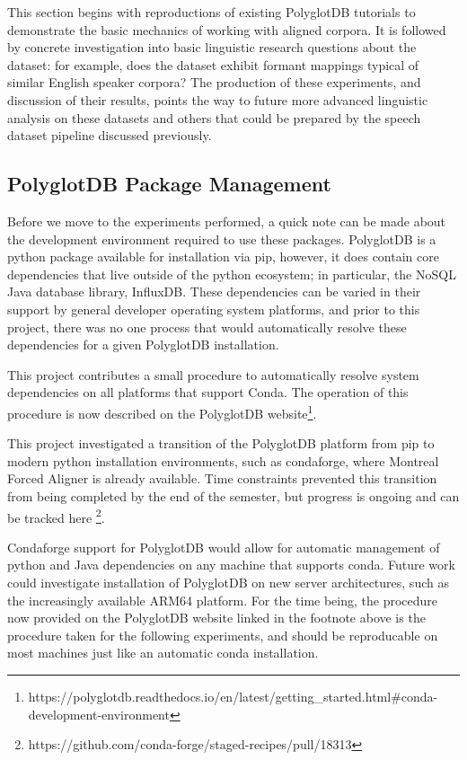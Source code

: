 \documentclass[11pt]{article}
\begin{document}
This section begins with reproductions of existing PolyglotDB tutorials to demonstrate the basic mechanics of working with aligned corpora. It is followed by concrete investigation into basic linguistic research questions about the dataset: for example, does the dataset exhibit formant mappings typical of similar English speaker corpora? The production of these experiments, and discussion of their results, points the way to future more advanced linguistic analysis on these datasets and others that could be prepared by the speech dataset pipeline discussed previously.

\subsection{PolyglotDB Package Management}

Before we move to the experiments performed, a quick note can be made about the development environment required to use these packages. PolyglotDB is a python package available for installation via pip, however, it does contain core dependencies that live outside of the python ecosystem; in particular, the NoSQL Java database library, InfluxDB. These dependencies can be varied in their support by general developer operating system platforms, and prior to this project, there was no one process that would automatically resolve these dependencies for a given PolyglotDB installation.

This project contributes a small procedure to automatically resolve system dependencies on all platforms that support Conda. The operation of this procedure is now described on the PolyglotDB website\footnote{https://polyglotdb.readthedocs.io/en/latest/getting\_started.html\#conda-development-environment}.

This project investigated a transition of the PolyglotDB platform from pip to modern python installation environments, such as condaforge\cite{}, where Montreal Forced Aligner is already available. Time constraints prevented this transition from being completed by the end of the semester, but progress is ongoing and can be tracked here \footnote{https://github.com/conda-forge/staged-recipes/pull/18313}.

Condaforge support for PolyglotDB would allow for automatic management of python and Java dependencies on any machine that supports conda. Future work could investigate installation of PolyglotDB on new server architectures, such as the increasingly available ARM64 platform. For the time being, the procedure now provided on the PolyglotDB website linked in the footnote above is the procedure taken for the following experiments, and should be reproducable on most machines just like an automatic conda installation. 
\end{document}
